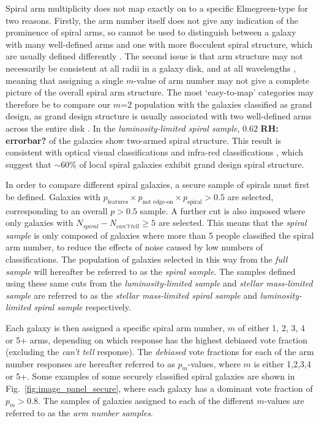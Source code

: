\documentclass[useAMS,usenatbib]{mn2e}
\newcommand{\rh}[1]{{\bf \textcolor{RoyalPurple}{RH: #1}}}
\begin{document}
Spiral arm multiplicity does not map exactly on to a specific Elmegreen-type for two reasons. Firstly, the arm number itself does not give any indication of the prominence of spiral arms, so cannot be used to distinguish between a galaxy with many well-defined arms and one with more flocculent spiral structure, which are usually defined differently \citep{EE_82,EE_87}. The second issue is that arm structure may not necessarily be consistent at all radii \citep{Grosbol_04} in a galaxy disk, and at all wavelengths \citep{Block_91,Block_94,Thornley_96}, meaning that assigning a single $m$-value of arm number may not give a complete picture of the overall spiral arm structure. The most `easy-to-map' categories may therefore be to compare our $m$=2 population with the galaxies classified as grand design, as grand design structure is usually associated with two well-defined arms across the entire disk \citep{EE_82}. In the \textit{luminosity-limited spiral sample}, $0.62$ \rh{errorbar?} of the galaxies show two-armed spiral structure. This result is consistent with optical visual classifications \citep{EE_82} and infra-red classifications \citep{Grosbol_04}, which suggest that $\sim 60\%$ of local spiral galaxies exhibit grand design spiral structure. 

In order to compare different spiral galaxies, a secure sample of spirals must first be defined. Galaxies with $p_{\textrm{features}} \times p_{\textrm{not edge-on}} \times p_{\textrm{spiral}} > 0.5$ are selected, corresponding to an overall $p>0.5$ sample. A further cut is also imposed where only galaxies with $N_{spiral} - N_{can't \, tell} \geq 5$ are selected. This means that the \textit{spiral sample} is only composed of galaxies where more than 5 people classified the spiral arm number, to reduce the effects of noise caused by low numbers of classifications. The population of galaxies selected in this way from the \textit{full sample} will hereafter be referred to as the \textit{spiral sample}. The samples defined using these same cuts from the \textit{luminosity-limited sample} and \textit{stellar mass-limited sample} are referred to as the \textit{stellar mass-limited spiral sample} and \textit{luminosity-limited spiral sample} respectively.

Each galaxy is then assigned a specific spiral arm number, $m$ of either 1, 2, 3, 4 or 5+ arms, depending on which response has the highest debiased vote fraction (excluding the \textit{can't tell} response). The \emph{debiased} vote fractions for each of the arm number responses are hereafter referred to as $p_m$-values, where $m$ is either 1,2,3,4 or 5+. Some examples of some securely classified spiral galaxies are shown in Fig.~\ref{fig:image_panel_secure}, where each galaxy has a dominant vote fraction of $p_m > 0.8$. The samples of galaxies assigned to each of the different $m$-values are referred to as the \textit{arm number samples}. 
\end{document}
